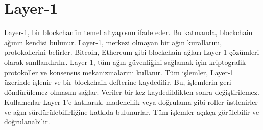\section{Layer-1}

Layer-1, bir blockchan'in temel altyapısını ifade eder. Bu katmanda, blockchain ağının kendisi bulunur. Layer-1, merkezi olmayan bir ağın kurallarını, protokollerini belirler. Bitcoin, Ethereum gibi blockchain ağları Layer-1 çözümleri olarak sınıflandırılır. Layer-1, tüm ağın güvenliğini sağlamak için kriptografik protokoller ve konsensüs mekanizmalarını kullanır. Tüm işlemler, Layer-1 üzerinde işlenir ve bir blockchain defterine kaydedilir. Bu, işlemlerin geri döndürülemez olmasını sağlar. Veriler bir kez kaydedildikten sonra değiştirilemez. Kullanıcılar Layer-1'e katılarak, madencilik veya doğrulama gibi roller üstlenirler ve ağın sürdürülebilirliğine katkıda bulunurlar. Tüm işlemler açıkça görülebilir ve doğrulanabilir.

\newpage